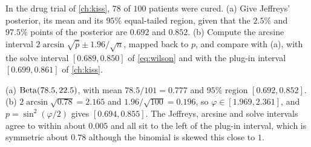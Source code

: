 \begin{exercise}
\label{ex:jeff-drug}
In the drug trial of \cref{ch:kiss}, $78$ of $100$ patients were cured. (a) Give Jeffreys' posterior, its mean and its $95\%$ equal-tailed region, given that the $2.5\%$ and $97.5\%$ points of the posterior are $0.692$ and $0.852$. (b) Compute the arcsine interval $2\arcsin\sqrt{\hat{p}} \pm 1.96/\sqrt{n}$, mapped back to $p$, and compare with (a), with the solve interval $[0.689, 0.850]$ of \cref{eq:wilson} and with the plug-in interval $[0.699, 0.861]$ of \cref{ch:kiss}.
\end{exercise}
\begin{solution}
(a) $\mathrm{Beta}(78.5, 22.5)$, with mean $78.5/101 = 0.777$ and $95\%$ region $[0.692, 0.852]$. (b) $2\arcsin\sqrt{0.78} = 2.165$ and $1.96/\sqrt{100} = 0.196$, so $\varphi \in [1.969, 2.361]$, and $p = \sin^2(\varphi/2)$ gives $[0.694, 0.855]$. The Jeffreys, arcsine and solve intervals agree to within about $0.005$ and all sit to the left of the plug-in interval, which is symmetric about $0.78$ although the binomial is skewed this close to $1$.
\end{solution}
